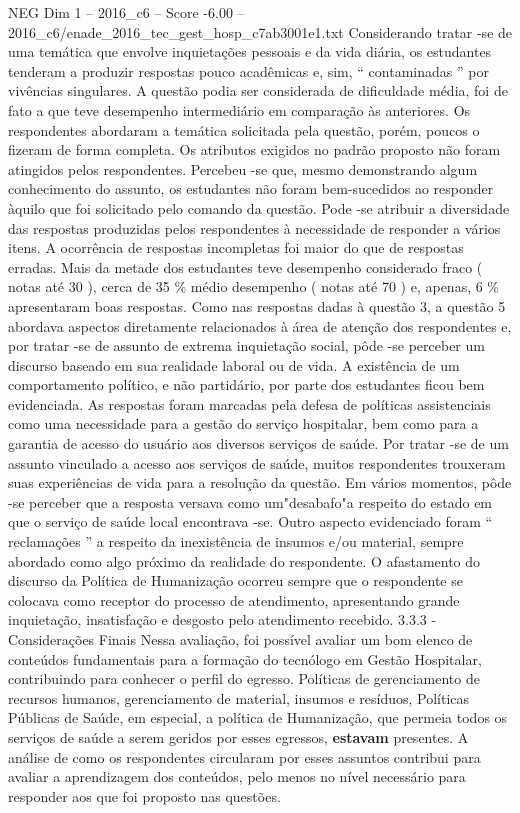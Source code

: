 \begin{textsample}{NEG Dim 1 – 2016\_c6 – Score -6.00 – 2016\_c6/enade\_2016\_tec\_gest\_hosp\_c7ab3001e1.txt}
Considerando tratar -se de uma temática que envolve inquietações pessoais e da vida diária, os estudantes tenderam a produzir respostas pouco acadêmicas e, sim, “ contaminadas ” por vivências singulares.
A questão podia ser considerada de dificuldade média, foi de fato a que teve desempenho intermediário em comparação às anteriores.
Os respondentes abordaram a temática solicitada pela questão, porém, poucos o fizeram de forma completa.
Os atributos exigidos no padrão proposto não foram atingidos pelos respondentes.
Percebeu -se que, mesmo demonstrando algum conhecimento do assunto, os estudantes não foram bem-sucedidos ao responder àquilo que foi solicitado pelo comando da questão.
Pode -se atribuir a diversidade das respostas produzidas pelos respondentes à necessidade de responder a vários itens.
A ocorrência de respostas incompletas foi maior do que de respostas erradas.
Mais da metade dos estudantes teve desempenho considerado fraco ( notas até 30 ), cerca de 35 \% médio desempenho ( notas até 70 ) e, apenas, 6 \% apresentaram boas respostas.
Como nas respostas dadas à questão 3, a questão 5 abordava aspectos diretamente relacionados à área de atenção dos respondentes e, por tratar -se de assunto de extrema inquietação social, pôde -se perceber um discurso baseado em sua realidade laboral ou de vida.
A existência de um comportamento político, e não partidário, por parte dos estudantes ficou bem evidenciada.
As respostas foram marcadas pela defesa de políticas assistenciais como uma necessidade para a gestão do serviço hospitalar, bem como para a garantia de acesso do usuário aos diversos serviços de saúde.
Por tratar -se de um assunto vinculado a acesso aos serviços de saúde, muitos respondentes trouxeram suas experiências de vida para a resolução da questão.
Em vários momentos, pôde -se perceber que a resposta versava como um"desabafo"a respeito do estado em que o serviço de saúde local encontrava -se.
Outro aspecto evidenciado foram “ reclamações ” a respeito da inexistência de insumos e/ou material, sempre abordado como algo próximo da realidade do respondente.
O afastamento do discurso da Política de Humanização ocorreu sempre que o respondente se colocava como receptor do processo de atendimento, apresentando grande inquietação, insatisfação e desgosto pelo atendimento recebido. 3.3.3 - Considerações Finais Nessa avaliação, foi possível avaliar um bom elenco de conteúdos fundamentais para a formação do tecnólogo em Gestão Hospitalar, contribuindo para conhecer o perfil do egresso.
Políticas de gerenciamento de recursos humanos, gerenciamento de material, insumos e resíduos, Políticas Públicas de Saúde, em especial, a política de Humanização, que permeia todos os serviços de saúde a serem geridos por esses egressos, \textbf{estavam} presentes.
A análise de como os respondentes circularam por esses assuntos contribui para avaliar a aprendizagem dos conteúdos, pelo menos no nível necessário para responder aos que foi proposto nas questões.

\end{textsample}

